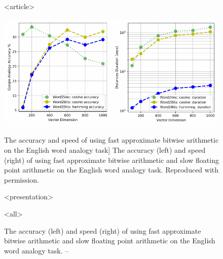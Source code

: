 \begin{figure}

\mode
<article>

\includegraphics{word2bits-speed}

\vspace{-0.8cm}

\caption
  [The accuracy and speed of using fast approximate bitwise arithmetic
   on the English word analogy task]%
  {The accuracy (left) and speed (right) of using fast approximate
   bitwise arithmetic and slow floating point arithmetic on the English word
   analogy task. Reproduced with permission. \cite[Figure 3.8]{stefanik2019semantic}}

\protect{}

\mode
<presentation>


\vspace{-0.4cm}

\caption
  {The accuracy (left) and speed (right) of using fast approximate
   bitwise arithmetic and slow floating point arithmetic on the English word
   analogy task. -- \textcite[Figure 3.8]{stefanik2019semantic}}

\mode
<all>

\label{fig:quantized-token-embeddings-with-fast-bitwise-arithmetic}
\end{figure}
